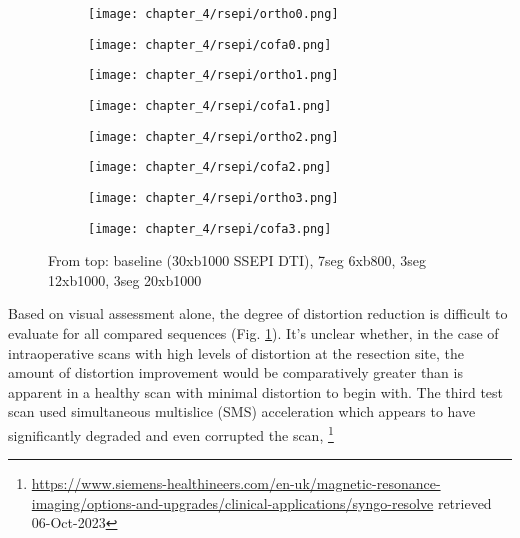 \begin{figure}[h!]
  \centering
  \begin{subfigure}[b]{0.65\textwidth}
    \centering
    \texttt{[image: chapter\_4/rsepi/ortho0.png]}
  \end{subfigure}%
  \begin{subfigure}[b]{0.3\textwidth}
    \centering
    \texttt{[image: chapter\_4/rsepi/cofa0.png]}
  \end{subfigure}
  \begin{subfigure}[b]{0.65\textwidth}
    \centering
    \texttt{[image: chapter\_4/rsepi/ortho1.png]}
  \end{subfigure}%
  \begin{subfigure}[b]{0.3\textwidth}
    \centering
    \texttt{[image: chapter\_4/rsepi/cofa1.png]}
  \end{subfigure}
  \begin{subfigure}[b]{0.65\textwidth}
    \centering
    \texttt{[image: chapter\_4/rsepi/ortho2.png]}
  \end{subfigure}%
  \begin{subfigure}[b]{0.3\textwidth}
    \centering
    \texttt{[image: chapter\_4/rsepi/cofa2.png]}
  \end{subfigure}
  \begin{subfigure}[b]{0.65\textwidth}
    \centering
    \texttt{[image: chapter\_4/rsepi/ortho3.png]}
  \end{subfigure}%
  \begin{subfigure}[b]{0.3\textwidth}
    \centering
    \texttt{[image: chapter\_4/rsepi/cofa3.png]}
  \end{subfigure}
  \caption{From top: baseline (30xb1000 SSEPI DTI), 7seg 6xb800, 3seg 12xb1000, 3seg 20xb1000}
  \label{fig:rsepi}
\end{figure}

Based on visual assessment alone, the degree of distortion reduction is difficult to evaluate for all compared sequences (Fig. \ref{fig:rsepi}).
It’s unclear whether, in the case of intraoperative scans with high levels of distortion at the resection site, the amount of distortion improvement would be comparatively greater than is apparent in a healthy scan with minimal distortion to begin with.
The third test scan used simultaneous multislice (SMS) acceleration which appears to have significantly degraded and even corrupted the scan, 
\footnote[2]{\url{https://www.siemens-healthineers.com/en-uk/magnetic-resonance-imaging/options-and-upgrades/clinical-applications/syngo-resolve} retrieved 06-Oct-2023}


